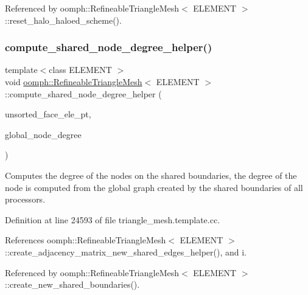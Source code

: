Referenced by oomph\+::\+Refineable\+Triangle\+Mesh$<$ E\+L\+E\+M\+E\+N\+T $>$\+::reset\+\_\+halo\+\_\+haloed\+\_\+scheme().

\mbox{\label{classoomph_1_1RefineableTriangleMesh_a4c2c3ff989c57ac84bbc9a8b5fb1db26}} 
\subsubsection{\texorpdfstring{compute\+\_\+shared\+\_\+node\+\_\+degree\+\_\+helper()}{compute\_shared\_node\_degree\_helper()}}
{\footnotesize\ttfamily template$<$class E\+L\+E\+M\+E\+NT $>$ \\
void \hyperlink{classoomph_1_1RefineableTriangleMesh}{oomph\+::\+Refineable\+Triangle\+Mesh}$<$ E\+L\+E\+M\+E\+NT $>$\+::compute\+\_\+shared\+\_\+node\+\_\+degree\+\_\+helper (\begin{DoxyParamCaption}\item[{\hyperlink{classoomph_1_1Vector}{Vector}$<$ \hyperlink{classoomph_1_1Vector}{Vector}$<$ \hyperlink{classoomph_1_1FiniteElement}{Finite\+Element} $\ast$$>$ $>$ \&}]{unsorted\+\_\+face\+\_\+ele\+\_\+pt,  }\item[{std\+::map$<$ \hyperlink{classoomph_1_1Node}{Node} $\ast$, unsigned $>$ \&}]{global\+\_\+node\+\_\+degree }\end{DoxyParamCaption})}



Computes the degree of the nodes on the shared boundaries, the degree of the node is computed from the global graph created by the shared boundaries of all processors. 



Definition at line 24593 of file triangle\+\_\+mesh.\+template.\+cc.



References oomph\+::\+Refineable\+Triangle\+Mesh$<$ E\+L\+E\+M\+E\+N\+T $>$\+::create\+\_\+adjacency\+\_\+matrix\+\_\+new\+\_\+shared\+\_\+edges\+\_\+helper(), and i.



Referenced by oomph\+::\+Refineable\+Triangle\+Mesh$<$ E\+L\+E\+M\+E\+N\+T $>$\+::create\+\_\+new\+\_\+shared\+\_\+boundaries().

